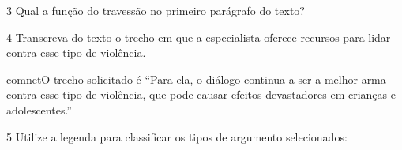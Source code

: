 
\num{3} Qual a função do travessão no primeiro parágrafo do texto?


\num{4} Transcreva do texto o trecho em que a especialista oferece recursos
para lidar contra esse tipo de violência. 

comnet{O trecho solicitado é ``Para ela, o diálogo continua a ser a melhor
arma contra esse tipo de violência, que pode causar efeitos devastadores em
crianças e adolescentes.''}

\num{5} Utilize a legenda para classificar os tipos de argumento selecionados:

